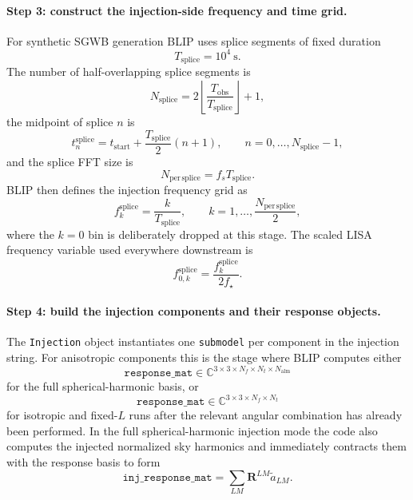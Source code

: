 \documentclass[11pt]{article}
\begin{document}
\paragraph{Step 3: construct the injection-side frequency and time grid.}
For synthetic SGWB generation BLIP uses splice segments of fixed duration
\begin{equation}
T_{\mathrm{splice}}=10^4\ \mathrm{s}.
\end{equation}
The number of half-overlapping splice segments is
\begin{equation}
N_{\mathrm{splice}}
=2\left\lfloor\frac{T_{\mathrm{obs}}}{T_{\mathrm{splice}}}\right\rfloor+1,
\end{equation}
the midpoint of splice $n$ is
\begin{equation}
t_n^{\mathrm{splice}}
=t_{\mathrm{start}}+\frac{T_{\mathrm{splice}}}{2}(n+1),
\qquad
n=0,\dots,N_{\mathrm{splice}}-1,
\end{equation}
and the splice FFT size is
\begin{equation}
N_{\mathrm{per\,splice}}=f_s T_{\mathrm{splice}}.
\end{equation}
BLIP then defines the injection frequency grid as
\begin{equation}
f_k^{\mathrm{splice}}=\frac{k}{T_{\mathrm{splice}}},
\qquad
k=1,\dots,\frac{N_{\mathrm{per\,splice}}}{2},
\end{equation}
where the $k=0$ bin is deliberately dropped at this stage. The scaled LISA frequency variable used everywhere downstream is
\begin{equation}
f_{0,k}^{\mathrm{splice}}=\frac{f_k^{\mathrm{splice}}}{2f_\star}.
\end{equation}

\paragraph{Step 4: build the injection components and their response objects.}
The \texttt{Injection} object instantiates one \texttt{submodel} per component in the injection string. For anisotropic components this is the stage where BLIP computes either
\begin{equation}
\texttt{response\_mat}\in\mathbb{C}^{3\times 3\times N_f\times N_t\times N_{\mathrm{alm}}}
\end{equation}
for the full spherical-harmonic basis, or
\begin{equation}
\texttt{response\_mat}\in\mathbb{C}^{3\times 3\times N_f\times N_t}
\end{equation}
for isotropic and fixed-$L$ runs after the relevant angular combination has already been performed. In the full spherical-harmonic injection mode the code also computes the injected normalized sky harmonics and immediately contracts them with the response basis to form
\begin{equation}
\texttt{inj\_response\_mat}
=\sum_{LM}\mathbf{R}^{LM}\tilde{a}_{LM}.
\end{equation}
\end{document}
